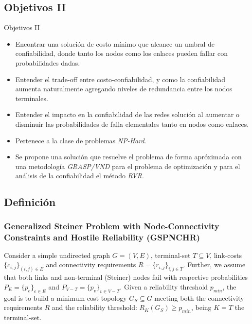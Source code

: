\subsection{Objetivos II}
\begin{frame}%
    \begin{block}{Objetivos II}
	\begin{itemize} 
    	\item Encontrar una solución de costo mínimo que alcance un umbral de confiabilidad, donde tanto los nodos como los enlaces pueden fallar con probabilidades dadas.
		\item Entender el trade-off entre costo-confiabilidad, y como la confiabilidad aumenta naturalmente agregando niveles de redundancia entre los nodos terminales.
		\item Entender el impacto en la confiabilidad de las redes solución al aumentar o disminuir las probabilidades de falla elementales tanto en nodos como enlaces.
    	\item Pertenece a la clase de problemas \emph{NP-Hard}.
    	\item Se propone una solución que resuelve el problema de forma apróximada con una metodología \emph{GRASP/VND} para el problema de optimización y para el análisis de la confiabilidad el método \emph{RVR}.
	\end{itemize} 
    \end{block}
\end{frame}

\subsection{Definición}
\begin{frame}\frametitle{Generalized Steiner Problem with Node-Connectivity Constraints and
Hostile Reliability (GSPNCHR)}
    \begin{definition}[GSPNCHR]
Consider a simple undirected graph $G=(V,E)$, terminal-set $T \subseteq V$, link-costs $\{c_{i,j}\}_{(i,j) \in E}$ 
and connectivity requirements $R=\{r_{i,j}\}_{i,j \in T}$. Further, we assume that both links and non-terminal (Steiner) nodes 
fail with respective probabilities $P_E=\{p_e\}_{e\in E}$ and $P_{V-T}=\{p_v\}_{v\in V-T}$. 
Given a reliability threshold $p_{min}$, the goal is to build 
a minimum-cost topology $G_S \subseteq G$ meeting both the connectivity requirements 
$R$ and the reliability threshold: $R_{K}(G_S) \geq p_{min}$, being $K=T$ the terminal-set.
\end{definition}
\end{frame}

